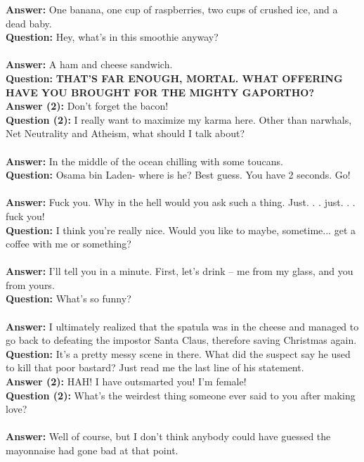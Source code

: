 \documentclass[a4paper]{article}
\begin{document}
\textbf{Answer:} One banana, one cup of raspberries, two cups of crushed ice, and a dead baby. \\
\textbf{Question:} Hey, what's in this smoothie anyway? \\ \\
\textbf{Answer:} A ham and cheese sandwich. \\
\textbf{Question:} \textbf{THAT'S FAR ENOUGH, MORTAL.
WHAT OFFERING HAVE YOU BROUGHT FOR THE MIGHTY GAPORTHO?} \\
\textbf{Answer (2):} Don't forget the bacon! \\
\textbf{Question (2):} I really want to maximize my karma here. Other than narwhals, Net Neutrality and Atheism, what should I talk about? \\ \\
\textbf{Answer:} In the middle of the ocean chilling with some toucans. \\
\textbf{Question:} Osama bin Laden- where is he? Best guess. You have 2 seconds. Go! \\ \\
\textbf{Answer:} Fuck you. Why in the hell would you ask such a thing. Just. . . just. . . fuck you! \\
\textbf{Question:} I think you're really nice. Would you like to maybe, sometime... get a coffee with me or something? \\ \\
\textbf{Answer:} I'll tell you in a minute. First, let's drink -- me from my glass, and you from yours. \\
\textbf{Question:} What's so funny? \\ \\
\textbf{Answer:} I ultimately realized that the spatula was in the cheese and managed to go back to defeating the impostor Santa Claus, therefore saving Christmas again. \\
\textbf{Question:} It's a pretty messy scene in there. What did the suspect say he used to kill that poor bastard? Just read me the last line of his statement. \\
\textbf{Answer (2):} HAH! I have outsmarted you! I'm female! \\
\textbf{Question (2):} What's the weirdest thing someone ever said to you after making love? \\ \\
\textbf{Answer:} Well of course, but I don't think anybody could have guessed the mayonnaise had gone bad at that point. \\
\end{document}
